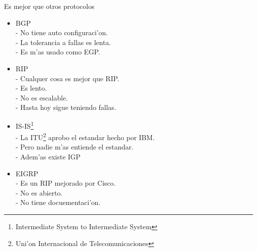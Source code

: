 \documentclass[xcolor=dvipsnames]{beamer}
\begin{document}
	\begin{frame}{Es mejor que otros protocolos}
	\scriptsize
	{
	\begin{itemize}
	\item BGP\\
			- No tiene auto configuraci'on. \\
			- La tolerancia a fallas es lenta. \\
			- Es m'as usado como EGP. \\
	\item RIP \\
			- Cualquer cosa es mejor que RIP.\\
			- Es lento.\\
			- No es escalable.\\
			- Hasta hoy sigue teniendo fallas.\\
	\item IS-IS\footnote{Intermediate System to Intermediate System}\\
			- La ITU\footnote{Uni'on Internacional de Telecomunicaciones} aprobo el estandar hecho por IBM. \\
			- Pero nadie m'as entiende el estandar. \\
			- Adem'as existe IGP\\
	\item EIGRP\\
			- Es un RIP mejorado por Cisco.\\
			- No es abierto.\\
			- No tiene docuementaci'on.\\
	\end{itemize}
	}
	\end{frame}
	
\end{document}
